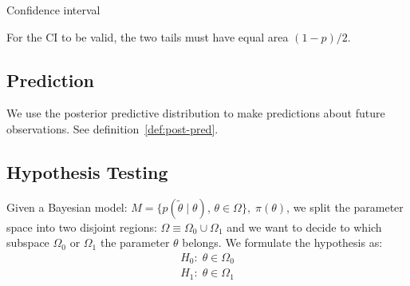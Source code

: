 \begin{example}{Confidence interval}{}
	\begin{nscenter}
	\end{nscenter}
    \begin{note}
        For the CI to be valid, the two tails must have equal area $(1-p)/2$.
    \end{note}
\end{example}

\subsection{Prediction}

We use the posterior predictive distribution to make predictions about future observations.
See definition~\ref{def:post-pred}.

\subsection{Hypothesis Testing}

Given a Bayesian model: $M = \{p(\tilde \theta \mid \theta),\,\theta \in \Omega\},\; \pi(\theta)$,
we split the parameter space into two disjoint regions: $\Omega \equiv \Omega_0 \cup \Omega_1$
and we want to decide to which subspace $\Omega_0$ or $\Omega_1$ the parameter $\theta$ belongs.
We formulate the hypothesis as:
\begin{align*}
    H_0:\; \theta \in \Omega_0 \\
    H_1:\; \theta \in \Omega_1
\end{align*}

